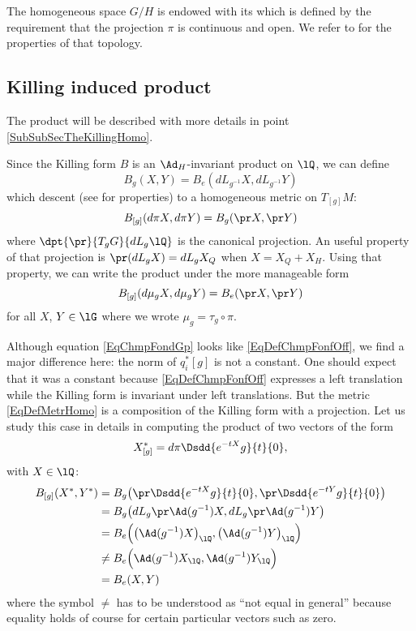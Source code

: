 The homogeneous space $G/H$ is endowed with its  which is defined by the requirement that the projection $\pi$ is continuous and open. We refer to \cite{Helgason} for the properties of that topology.

\subsection{Killing induced product}		\label{SubsecKillHomo}

The product will be described with more details in point \ref{SubSubSecTheKillingHomo}.

Since the Killing form $B$ is an $\Ad_H$-invariant product on $\lQ$, we can define
\begin{equation}
B_g(X,Y)=B_e(dL_{g^{-1}}X,dL_{g^{-1}}Y)
\end{equation}
which descent (see \cite{Kerin} for properties) to a homogeneous metric on $T_{[g]}M$:
\begin{equation}  \label{EqDefMetrHomo}
B_{[g]}(d\pi X,d\pi Y)=B_g(\pr X,\pr Y)
\end{equation}
where $\dpt{\pr}{T_gG}{dL_g\lQ}$ is the canonical projection. An useful property of that projection is $\pr(dL_gX)=dL_gX_Q$ when $X=X_Q+X_H$. Using that property, we can write the product under the more manageable form
\[ 
  B_{[g]}(d\mu_gX,d\mu_gY)=B_e(\pr X,\pr Y)
\]
for all $X$, $Y\in\lG$ where we wrote $\mu_g=\tau_g\circ \pi$.

Although equation \eqref{EqChmpFondGp} looks like \eqref{EqDefChmpFonfOff}, we find a major difference here: the norm of $q_i^*[g]$ is not a constant. One should expect that it was a constant because \eqref{EqDefChmpFonfOff} expresses a left translation while the Killing form is invariant under left translations. But the metric \eqref{EqDefMetrHomo} is a composition of the Killing form with a projection. Let us study this case in details in computing the product of two vectors of the form
\[ 
  X^*_{[g]}=d\pi\Dsdd{  e^{-tX}g }{t}{0},
\]
with $X\in\lQ$:
\[ 
\begin{split}
  B_{[g]}(X^*,Y^*)&=B_g\big( \pr\Dsdd{  e^{-tX}g }{t}{0},\pr\Dsdd{  e^{-tY}g }{t}{0} \big)\\
		&=B_g\big( dL_g\pr\Ad(g^{-1})X,dL_g\pr\Ad(g^{-1})Y \big)\\
		&=B_e\Big(   \big( \Ad(g^{-1})X \big)_{\lQ},\big( \Ad(g^{-1})Y \big)_{\lQ}  \Big)\\
		&\neq B_e\Big(   \Ad(g^{-1})X_{\lQ},\Ad(g^{-1})Y_{\lQ}  \Big)\\
		&=B_e(X,Y)
\end{split}
\]
where the symbol $\neq$ has to be understood as ``not equal in general'' because equality holds of course for certain particular vectors such as zero.


